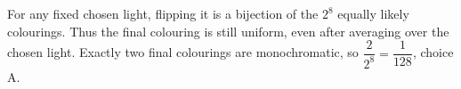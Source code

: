 For any fixed chosen light, flipping it is a bijection of the $2^8$ equally likely colourings. Thus the final colouring is still uniform, even after averaging over the chosen light. Exactly two final colourings are monochromatic, so $\boxed{\dfrac{2}{2^8}=\dfrac{1}{128}}$, choice A.
